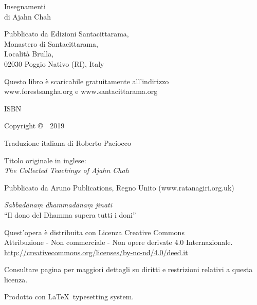 \cleartoverso
\thispagestyle{empty}

{\copyrightsize
\centering
\setlength{\parindent}{0pt}%
\setlength{\parskip}{0.8\baselineskip}%

Insegnamenti\\
di Ajahn Chah

Pubblicato da Edizioni Santacittarama,\\
Monastero di Santacittarama,\\
Località Brulla,\\
02030 Poggio Nativo (RI), Italy

Questo libro è scaricabile gratuitamente all'indirizzo\\
www.forestsangha.org e www.santacittarama.org

ISBN \theISBN

Copyright \copyright\ \thePublisher\ 2019

Traduzione italiana di Roberto Paciocco

Titolo originale in inglese:\\
\emph{The Collected Teachings of Ajahn Chah}

Pubblicato da Aruno Publications, Regno Unito (www.ratanagiri.org.uk)

\emph{Sabbadānaṃ dhammadānaṃ jinati}\\
``Il dono del Dhamma supera tutti i doni''

\vfill

{\footnotesize
Quest'opera è distribuita con Licenza Creative Commons\\
Attribuzione - Non commerciale - Non opere derivate 4.0 Internazionale.\\
\href{http://creativecommons.org/licenses/by-nc-nd/4.0/deed.it}{http://creativecommons.org/licenses/by-nc-nd/4.0/deed.it}

Consultare pagina \pageref{copyright-details} per maggiori dettagli su diritti e restrizioni relativi a questa licenza.

Prodotto con \LaTeX\ typesetting system.


\theEditionInfo

}}
